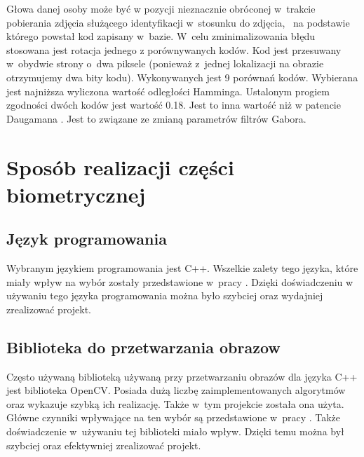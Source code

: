 Głowa danej osoby może być w pozycji nieznacznie obróconej w~trakcie pobierania zdjęcia służącego identyfikacji w~stosunku do zdjęcia, ~na podstawie  którego powstał kod zapisany  w~bazie. W~celu zminimalizowania błędu stosowana jest rotacja jednego z porównywanych kodów. Kod jest przesuwany w~obydwie strony o~dwa piksele (ponieważ z~jednej lokalizacji na obrazie otrzymujemy dwa bity kodu). Wykonywanych jest 9 porównań kodów. Wybierana jest najniższa wyliczona wartość odległości Hamminga. Ustalonym progiem zgodności dwóch kodów jest wartość 0.18. Jest to inna wartość niż w patencie Daugamana \cite{Daugman}. Jest to związane ze zmianą parametrów filtrów Gabora.

\section{Sposób realizacji części biometrycznej}
\label{subsec:realizacjaBio}

\subsection{Język programowania}
\label{sec:jezykProgramowania}
Wybranym językiem programowania jest C++. Wszelkie zalety tego języka, które miały wpływ na wybór zostały przedstawione w~pracy \cite{Gl11}. Dzięki doświadczeniu w używaniu tego języka programowania można było szybciej oraz wydajniej zrealizować projekt.

\subsection{Biblioteka do przetwarzania obrazow}
\label{sec:bibliotekaObrazow}
Często używaną biblioteką używaną przy przetwarzaniu obrazów dla języka C++ jest biblioteka OpenCV. Posiada dużą liczbę zaimplementowanych algorytmów oraz wykazuje szybką ich realizację. Także w~tym projekcie została ona użyta. Główne czynniki wpływające na ten wybór są przedstawione w~pracy \cite{Gl11}. Także doświadczenie w~używaniu tej biblioteki miało wpływ. Dzięki temu można był szybciej oraz efektywniej zrealizować projekt.


